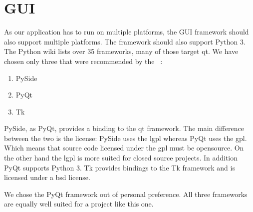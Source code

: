 \section{GUI}

As our application has to run on multiple platforms, the GUI framework should
also support multiple platforms. The framework should also support Python 3. The
Python wiki lists over 35 frameworks, many of those target \gls{qt}. We have chosen
only three that were recommended by the
~\cite{schlusser2016hitchhikers}:

\begin{enumerate}
    \item PySide
    \item PyQt
    \item Tk
\end{enumerate}

PySide, as PyQt, provides a binding to the \gls{qt} framework. The main difference
between the two is the license: PySide uses the \acrfull{lgpl} whereas PyQt uses
the \acrfull{gpl}. Which means that source code licensed under the
\acrshort{gpl} must be opensource. On the other hand the
\acrshort{lgpl} is more suited for closed source projects. In addition PyQt
supports Python 3. Tk provides bindings to the Tk framework and is licensed
under a \acrfull{bsd} license.

We chose the PyQt framework out of personal preference. All three frameworks
are equally well suited for a project like this one.



